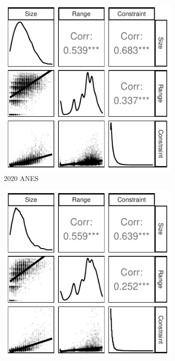 \documentclass[12pt]{article}
\begin{document}
\begin{figure}[h]
	\begin{subfigure}[h]{0.27\textwidth}
		\centering
		\includegraphics[width=\textwidth]{../out/appB4c-anes2020_components.pdf}
		\caption{2020 ANES}
	\end{subfigure}%
	\begin{subfigure}[h]{0.27\textwidth}
		\centering
		\includegraphics[width=\textwidth]{../out/appB4d-anes2016_components.pdf}

\end{subfigure}
\end{figure}
\end{document}
